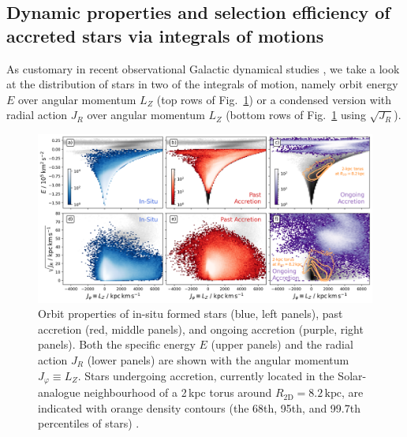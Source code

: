 \documentclass[fleqn,usenatbib]{mnras}
\begin{document}
\subsection{Dynamic properties and selection efficiency of accreted stars via integrals of motions} \label{sec:analysis_dynamic_properties}

As customary in recent observational Galactic dynamical studies \citep[for example][]{Helmi2018, Trick2019, Helmi2020, Buder2022}, we take a look at the distribution of stars in two of the integrals of motion, namely orbit energy $E$ over angular momentum $L_Z$ (top rows of Fig.~\ref{fig:lz_e_jr}) or a condensed version with radial action $J_R$ over angular momentum $L_Z$ (bottom rows of Fig.~\ref{fig:lz_e_jr} using $\sqrt{J_R}$).

\begin{figure}
    \centering
    \includegraphics[width=\textwidth]{figures/lz_e_jr.png}
    \caption{Orbit properties of in-situ formed stars (blue, left panels), past accretion (red, middle panels), and ongoing accretion (purple, right panels). Both the specific energy $E$ (upper panels) and the radial action $J_R$ (lower panels) are shown with the angular momentum $J_\varphi \equiv L_Z$. Stars undergoing accretion, currently located in the Solar-analogue neighbourhood of a 2\,kpc torus around $R_\mathrm{2D} = 8.2\,\mathrm{kpc}$, are indicated with orange density contours (the 68th, 95th, and 99.7th percentiles of stars) \href{https://github.com/svenbuder/golden_thread_I/tree/main/figures}{\faGithub}.
    \label{fig:lz_e_jr}}
\end{figure}
\end{document}
